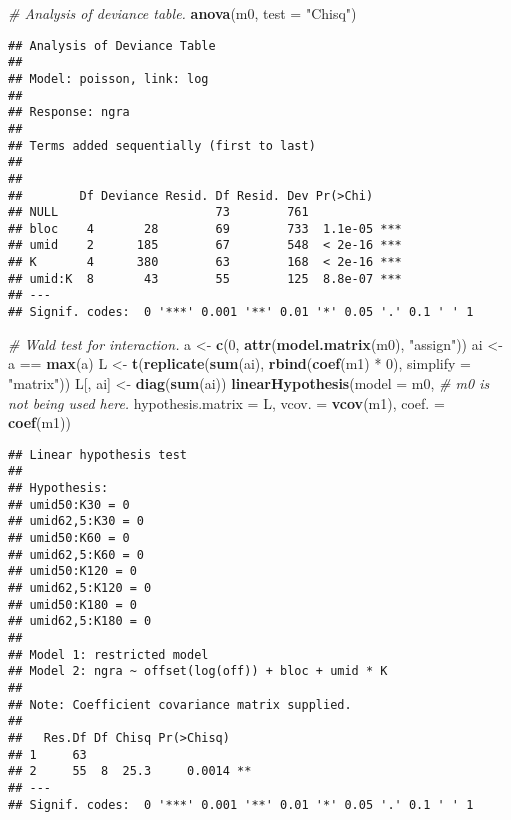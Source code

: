 \documentclass[9pt,a5paper,]{book}
\newenvironment{Shaded}{}{}
\newcommand{\KeywordTok}[1]{\textbf{{#1}}}
\newcommand{\DataTypeTok}[1]{\underline{{#1}}}
\newcommand{\DecValTok}[1]{{#1}}
\newcommand{\StringTok}[1]{{#1}}
\newcommand{\CommentTok}[1]{\textit{{#1}}}
\newcommand{\NormalTok}[1]{{#1}}
\renewenvironment{Shaded}{\color{inputcolor}}{}
\renewcommand{\DataTypeTok}[1]{{#1}}
\theoremstyle{definition}
\theoremstyle{definition}
\theoremstyle{remark}
\begin{document}
\begin{Shaded}
\begin{Highlighting}[]
\CommentTok{# Analysis of deviance table.}
\KeywordTok{anova}\NormalTok{(m0, }\DataTypeTok{test =} \StringTok{"Chisq"}\NormalTok{)}
\end{Highlighting}
\end{Shaded}

\begin{verbatim}
## Analysis of Deviance Table
## 
## Model: poisson, link: log
## 
## Response: ngra
## 
## Terms added sequentially (first to last)
## 
## 
##        Df Deviance Resid. Df Resid. Dev Pr(>Chi)    
## NULL                      73        761             
## bloc    4       28        69        733  1.1e-05 ***
## umid    2      185        67        548  < 2e-16 ***
## K       4      380        63        168  < 2e-16 ***
## umid:K  8       43        55        125  8.8e-07 ***
## ---
## Signif. codes:  0 '***' 0.001 '**' 0.01 '*' 0.05 '.' 0.1 ' ' 1
\end{verbatim}

\begin{Shaded}
\begin{Highlighting}[]
\CommentTok{# Wald test for interaction.}
\NormalTok{a <-}\StringTok{ }\KeywordTok{c}\NormalTok{(}\DecValTok{0}\NormalTok{, }\KeywordTok{attr}\NormalTok{(}\KeywordTok{model.matrix}\NormalTok{(m0), }\StringTok{"assign"}\NormalTok{))}
\NormalTok{ai <-}\StringTok{ }\NormalTok{a ==}\StringTok{ }\KeywordTok{max}\NormalTok{(a)}
\NormalTok{L <-}\StringTok{ }\KeywordTok{t}\NormalTok{(}\KeywordTok{replicate}\NormalTok{(}\KeywordTok{sum}\NormalTok{(ai), }\KeywordTok{rbind}\NormalTok{(}\KeywordTok{coef}\NormalTok{(m1) *}\StringTok{ }\DecValTok{0}\NormalTok{), }\DataTypeTok{simplify =} \StringTok{"matrix"}\NormalTok{))}
\NormalTok{L[, ai] <-}\StringTok{ }\KeywordTok{diag}\NormalTok{(}\KeywordTok{sum}\NormalTok{(ai))}
\KeywordTok{linearHypothesis}\NormalTok{(}\DataTypeTok{model =} \NormalTok{m0, }\CommentTok{# m0 is not being used here.}
                 \DataTypeTok{hypothesis.matrix =} \NormalTok{L,}
                 \DataTypeTok{vcov. =} \KeywordTok{vcov}\NormalTok{(m1),}
                 \DataTypeTok{coef. =} \KeywordTok{coef}\NormalTok{(m1))}
\end{Highlighting}
\end{Shaded}

\begin{verbatim}
## Linear hypothesis test
## 
## Hypothesis:
## umid50:K30 = 0
## umid62,5:K30 = 0
## umid50:K60 = 0
## umid62,5:K60 = 0
## umid50:K120 = 0
## umid62,5:K120 = 0
## umid50:K180 = 0
## umid62,5:K180 = 0
## 
## Model 1: restricted model
## Model 2: ngra ~ offset(log(off)) + bloc + umid * K
## 
## Note: Coefficient covariance matrix supplied.
## 
##   Res.Df Df Chisq Pr(>Chisq)   
## 1     63                       
## 2     55  8  25.3     0.0014 **
## ---
## Signif. codes:  0 '***' 0.001 '**' 0.01 '*' 0.05 '.' 0.1 ' ' 1
\end{verbatim}
\end{document}

